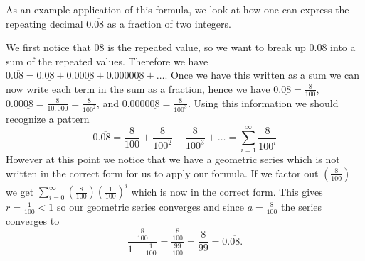 %
%
%
%

As an example application of this formula, we look at how one can
express the repeating decimal $0.\overline{08}$ as a fraction of two integers.

We first notice that $08$
is the repeated value, so we want to break up $0.\overline{08}$ into
a sum of the repeated values.  Therefore we have $0.\overline{08}=
0.\underline{08}+ 0.00\underline{08}+ 0.0000\underline{08}+ \ldots$.
Once we have this written as a sum we can now write each term in the
sum as a fraction, hence we have $0.\underline{08}=\frac{8}{100}$,
$0.00\underline{08}=\frac{8}{10,000}=\frac{8}{100^{2}}$, and
$0.0000\underline{08}=\frac{8}{100^{3}}$.  Using this information we
should recognize a pattern $$0.\overline{08} = \frac{8}{100} +
\frac{8}{100^{2}} + \frac{8}{100^{3}} + \ldots = \sum_{i=1}^{\infty}
\frac{8}{100^{i}}$$ However at this point we notice that we have a
geometric series which is not written in the correct form for us to
apply our formula.  If we factor out $(\frac{8}{100})$ we get
$\displaystyle{\sum_{i=0}^{\infty}
(\frac{8}{100})(\frac{1}{100})^i}$ which is now in the correct
form. This gives $r=\frac{1}{100} <1$ so our geometric series
converges and since $a=\frac{8}{100}$ the series converges to
$$\frac{\frac{8}{100}}{1-\frac{1}{100}}=\frac{\frac{8}{100}}{\frac{99}{100}}=\frac{8}{99}=0.\overline{08}.$$

